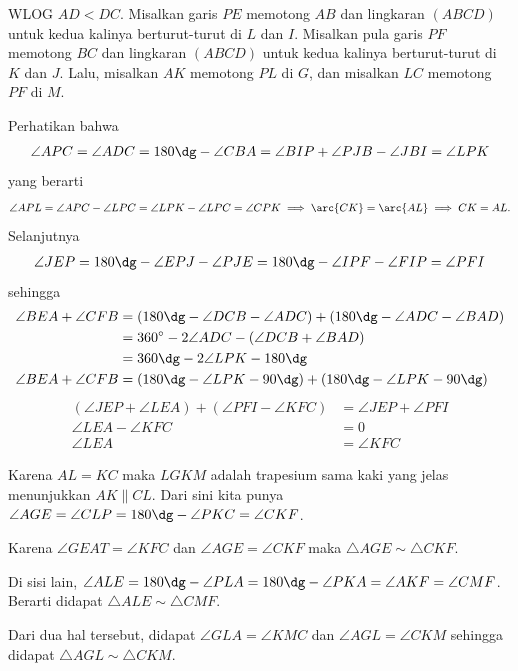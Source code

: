 WLOG $AD < DC$. Misalkan garis $PE$ memotong $AB$ dan lingkaran $(ABCD)$ untuk kedua kalinya berturut-turut di $L$ dan $I$. Misalkan pula garis $PF$ memotong $BC$ dan lingkaran $(ABCD)$ untuk kedua kalinya berturut-turut di $K$ dan $J$. Lalu, misalkan $AK$ memotong $PL$ di $G$, dan misalkan $LC$ memotong $PF$ di $M$.

Perhatikan bahwa
\begin{align*}
    \angle APC = \angle ADC = 180\dg - \angle CBA = \angle BIP + \angle PJB - \angle JBI = \angle LPK
\end{align*}
yang berarti
\begin{align*}
    \angle APL = \angle APC - \angle LPC = \angle LPK - \angle LPC = \angle CPK \implies \arc{CK} = \arc{AL} \implies CK = AL.
\end{align*}
Selanjutnya
\begin{align*}
    \angle JEP = 180\dg - \angle EPJ - \angle PJE = 180\dg - \angle IPF - \angle FIP = \angle PFI
\end{align*}
sehingga
\begin{align*}
    \angle BEA + \angle CFB &= (180\dg - \angle DCB - \angle ADC) + (180\dg - \angle ADC - \angle BAD)\\
    &= 360^\circ - 2\angle ADC - (\angle DCB + \angle BAD)\\
    &= 360\dg  - 2\angle LPK - 180\dg\\
    \angle BEA + \angle CFB &= (180\dg - \angle LPK - 90\dg) + (180\dg - \angle LPK - 90\dg)
\end{align*}
\begin{align*}
     (\angle JEP + \angle LEA) + (\angle PFI - \angle KFC)  &= \angle JEP + \angle PFI\\
     \angle LEA - \angle KFC &= 0\\
     \angle LEA &= \angle KFC
\end{align*}

Karena $AL = KC$ maka $LGKM$ adalah trapesium sama kaki yang jelas menunjukkan $AK \parallel CL$. Dari sini kita punya
$\angle AGE = \angle CLP = 180\dg - \angle PKC = \angle CKF$.

Karena $\angle GEA T= \angle KFC$ dan $\angle AGE = \angle CKF$ maka $\triangle AGE \sim \triangle CKF$.

Di sisi lain, $\angle ALE = 180\dg - \angle PLA = 180\dg - \angle PKA = \angle AKF = \angle CMF$. Berarti didapat $\triangle ALE \sim \triangle CMF$.

Dari dua hal tersebut, didapat $\angle GLA = \angle KMC$ dan $\angle AGL = \angle CKM$ sehingga didapat $\triangle AGL \sim \triangle CKM$.

